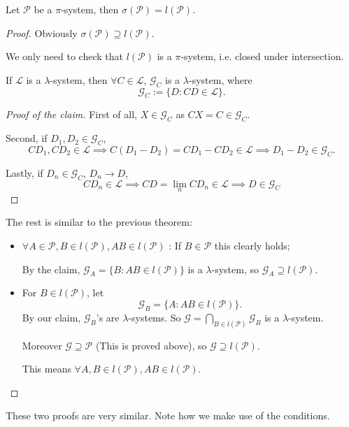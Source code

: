\begin{theorem}
    Let $\mathscr{P}$ be a $\pi$-system, then  $\sigma(\mathscr{P})=l(\mathscr{P})$.
\end{theorem}
\begin{proof}[Proof]
    Obviously $\sigma(\mathscr{P})\supseteq l(\mathscr{P})$.

	We only need to check that $l(\mathscr{P})$ is a $\pi$-system,
	i.e. closed under intersection.

	\begin{claim}
		If $\mathscr{L}$ is a $\lambda$-system, then  $\forall C\in \mathscr{L}$,
		$\mathscr{G}_C$ is a $\lambda$-system, where
		\[
		\mathscr{G}_C := \{D: CD\in \mathscr{L}\}.
		\]
	\end{claim}
	\begin{proof}[Proof of the claim]
		First of all, $X\in \mathscr{G}_C$ as $CX = C\in \mathscr{G}_C$.

		Second, if $D_1,D_2\in \mathscr{G}_C$,
		\[
			CD_1,CD_2\in \mathscr{L}\implies C(D_1-D_2)=CD_1-CD_2\in \mathscr{L}
			\implies D_1-D_2\in \mathscr{G}_C.
		\]

		Lastly, if $D_n\in \mathscr{G}_C$, $D_n \to D$,
		\[
		CD_n\in \mathscr{L}\implies CD = \lim_{n}CD_n \in \mathscr{L}
		\implies D\in \mathscr{G}_C
		\]
	\end{proof}

	The rest is similar to the previous theorem:
	\begin{itemize}
		\item $\forall A\in \mathscr{P}, B\in l(\mathscr{P}), AB\in l(\mathscr{P})$ :
			If $B\in \mathscr{P}$ this clearly holds;

			By the claim, $\mathscr{G}_A = \{B:AB\in l(\mathscr{P})\}$ is
			a $\lambda$-system, so  $\mathscr{G}_A\supseteq l(\mathscr{P})$.
		\item For $B\in l(\mathscr{P})$, let
			\[
			\mathscr{G}_B = \{A: AB\in l(\mathscr{P})\}.
			\]
			By our claim, $\mathscr{G}_B$'s are $\lambda$-systems.
			So  $\mathscr{G} = \bigcap_{B\in l(\mathscr{P})} \mathscr{G}_B$
			is a $\lambda$-system.

			Moreover $\mathscr{G}\supseteq \mathscr{P}$ (This is proved above),
			so $\mathscr{G}\supseteq l(\mathscr{P})$.

			This means  $\forall A,B\in l(\mathscr{P}), AB\in l(\mathscr{P})$.
	\end{itemize}
\end{proof}

\begin{remark}
    These two proofs are very similar. Note how we make use of the conditions.
\end{remark}

